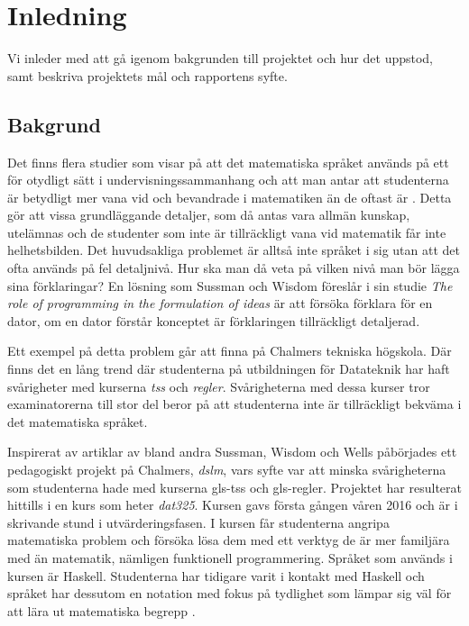 \documentclass[12pt,a4paper,twoside,openright]{article}
\begin{document}
\section{Inledning}
Vi inleder med att gå igenom bakgrunden till projektet och hur det
uppstod, samt beskriva projektets mål och rapportens syfte.

\subsection{Bakgrund}
%

Det finns flera studier som visar på att det matematiska språket
används på ett för otydligt sätt i undervisningssammanhang och att man
antar att studenterna är betydligt mer vana vid och bevandrade i
matematiken än de oftast är \cite{sussman2002role}
\cite{wells1995communicating}. Detta gör att vissa grundläggande
detaljer, som då antas vara allmän kunskap, utelämnas och de studenter
som inte är tillräckligt vana vid matematik får inte helhetsbilden.
Det huvudsakliga problemet är alltså inte språket i sig utan att det
ofta används på fel detaljnivå. Hur ska man då veta på vilken nivå man
bör lägga sina förklaringar? En lösning som Sussman och Wisdom
föreslår i sin studie \textit{The role of programming in the
  formulation of ideas} \cite{sussman2002role} är att försöka förklara
för en dator, om en dator förstår konceptet är förklaringen
tillräckligt detaljerad.

Ett exempel på detta problem går att finna på Chalmers tekniska
högskola. Där finns det en lång trend där studenterna på utbildningen
för Datateknik har haft svårigheter med kurserna \textit{\gls{tss}}
och \textit{\gls{regler}}. Svårigheterna med dessa kurser tror
examinatorerna till stor del beror på att studenterna inte är
tillräckligt bekväma i det matematiska språket.

Inspirerat av artiklar av bland andra Sussman, Wisdom och Wells
påbörjades ett pedagogiskt projekt på Chalmers, \textit{\gls{dslm}},
vars syfte var att minska svårigheterna som studenterna hade med
kurserna \gls{gls-tss} och \gls{gls-regler}. Projektet har resulterat
hittills i en kurs som heter \textit{\gls{dat325}}. Kursen gavs första
gången våren 2016 och är i skrivande stund i utvärderingsfasen. I
kursen får studenterna angripa matematiska problem och försöka lösa
dem med ett verktyg de är mer familjära med än matematik, nämligen
funktionell programmering. Språket som används i kursen är
Haskell. Studenterna har tidigare varit i kontakt med Haskell och
språket har dessutom en notation med fokus på tydlighet som lämpar sig
väl för att lära ut matematiska begrepp
\cite{TFPIE15_DSLsofMath_IonescuJansson}.
\end{document}

